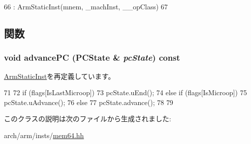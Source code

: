 \begin{DoxyCode}
66         : ArmStaticInst(mnem, _machInst, __opClass)
67     {}
\end{DoxyCode}


\subsection{関数}
\hypertarget{classArmISA_1_1MightBeMicro64_af04cd01429462d48e635f3e01ced6257}{
\subsubsection[{advancePC}]{\setlength{\rightskip}{0pt plus 5cm}void advancePC (PCState \& {\em pcState}) const}}
\label{classArmISA_1_1MightBeMicro64_af04cd01429462d48e635f3e01ced6257}


\hyperlink{classArmISA_1_1ArmStaticInst_af04cd01429462d48e635f3e01ced6257}{ArmStaticInst}を再定義しています。


\begin{DoxyCode}
71     {
72         if (flags[IsLastMicroop]) {
73             pcState.uEnd();
74         } else if (flags[IsMicroop]) {
75             pcState.uAdvance();
76         } else {
77             pcState.advance();
78         }
79     }
\end{DoxyCode}


このクラスの説明は次のファイルから生成されました:\begin{DoxyCompactItemize}
\item 
arch/arm/insts/\hyperlink{mem64_8hh}{mem64.hh}\end{DoxyCompactItemize}
